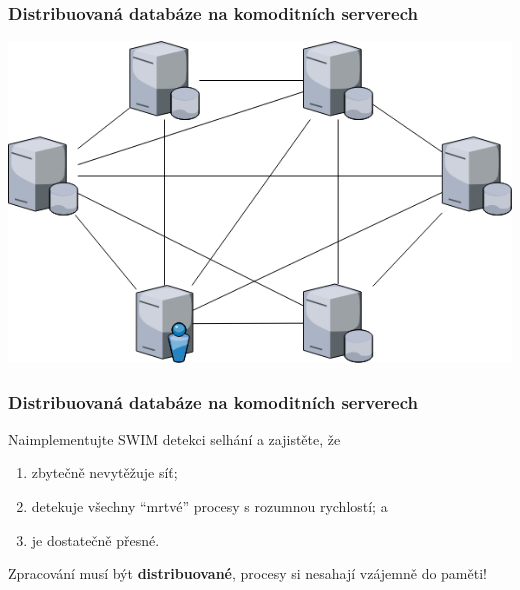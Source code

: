 \documentclass[usenames,dvipsnames,9pt]{beamer}
\begin{document}
\begin{frame}
  \frametitle{Distribuovaná databáze na komoditních serverech}
  \begin{center}
  \includegraphics[width=.95\linewidth]{10/figs/dist_db.png}
  \end{center}
\end{frame}


\begin{frame}
  \frametitle{Distribuovaná databáze na komoditních serverech}
  Naimplementujte SWIM detekci selhání a zajistěte, že
  \begin{enumerate}
    \item zbytečně nevytěžuje síť;
    \item detekuje všechny ``mrtvé'' procesy s rozumnou rychlostí; a
    \item je dostatečně přesné.
  \end{enumerate}

  Zpracování musí být {\bf distribuované}, procesy si nesahají vzájemně do paměti!






\end{frame}


\framefeedback{}
\end{document}
